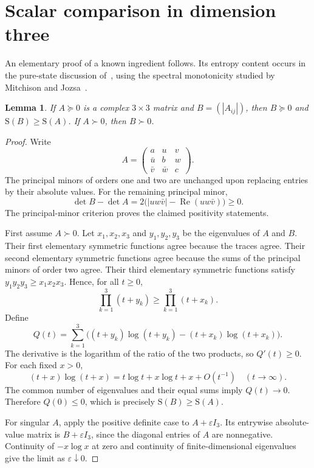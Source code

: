 \documentclass[11pt,a4paper]{article}
\newtheorem{lemma}[theorem]{Lemma}
\newcommand{\Ent}{\mathrm{S}}
\begin{document}
\section{Scalar comparison in dimension three}

An elementary proof of a known ingredient follows. Its entropy
content occurs in the pure-state discussion of~\cite{fmrz}, using the
spectral monotonicity studied by Mitchison and Jozsa~\cite{mj}.

\begin{lemma}\label{lem:scalar}
If $A\succeq0$ is a complex $3\times3$ matrix and $B=(|A_{ij}|)$, then
$B\succeq0$ and $\Ent(B)\ge\Ent(A)$. If $A\succ0$, then $B\succ0$.
\end{lemma}

\begin{proof}
Write
\[
 A=\begin{pmatrix}a&u&v\\ \bar u&b&w\\ \bar v&\bar w&c\end{pmatrix}.
\]
The principal minors of orders one and two are unchanged upon replacing
entries by their absolute values. For the remaining principal minor,
\[
 \det B-\det A
 =2\bigl(|u w\bar v|-\operatorname{Re}(u w\bar v)\bigr)\ge0.
\]
The principal-minor criterion proves the claimed positivity statements.

First assume $A\succ0$. Let $x_1,x_2,x_3$ and $y_1,y_2,y_3$ be the
eigenvalues of $A$ and $B$. Their first elementary symmetric functions
agree because the traces agree. Their second elementary symmetric
functions agree because the sums of the principal minors of order two
agree. Their third elementary symmetric functions satisfy
$y_1y_2y_3\ge x_1x_2x_3$. Hence, for all $t\ge0$,
\[
 \prod_{k=1}^3(t+y_k)\ge\prod_{k=1}^3(t+x_k).
\]
Define
\[
 Q(t)=\sum_{k=1}^3\bigl((t+y_k)\log(t+y_k)
                       -(t+x_k)\log(t+x_k)\bigr).
\]
The derivative is the logarithm of the ratio of the two products, so
$Q'(t)\ge0$. For each fixed $x>0$,
\[
 (t+x)\log(t+x)=t\log t+x\log t+x+O(t^{-1})
 \quad(t\longrightarrow\infty).
\]
The common number of eigenvalues and their equal sums imply
$Q(t)\longrightarrow0$. Therefore $Q(0)\le0$, which is precisely
$\Ent(B)\ge\Ent(A)$.

For singular $A$, apply the positive definite case to $A+\varepsilon I_3$.
Its entrywise absolute-value matrix is $B+\varepsilon I_3$, since the
diagonal entries of $A$ are nonnegative. Continuity of $-x\log x$ at zero
and continuity of finite-dimensional eigenvalues give the limit as
$\varepsilon\downarrow0$.
\end{proof}
\end{document}
